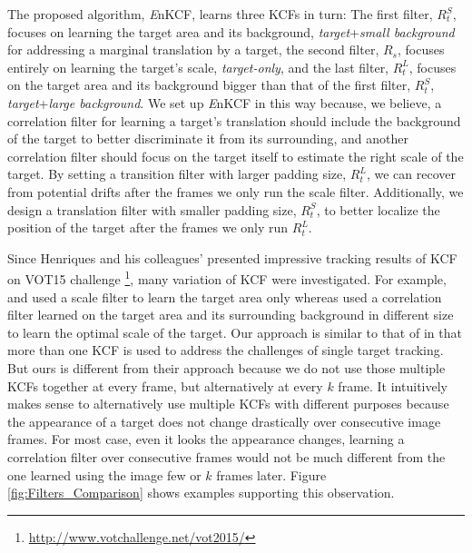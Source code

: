 \documentclass[10pt,twocolumn,letterpaper]{article}
\begin{document}
The proposed algorithm, {\it E}nKCF, learns three KCFs in turn: The
first filter, $R_{t}^{S}$, focuses on learning the target area and its
background, \textit{target}+\textit{small background} for addressing a
marginal translation by a target, the second filter, $R_{s}$, focuses
entirely on learning the target's scale, \textit{target-only}, and the
last filter, $R_{t}^{L}$, focuses on the target area and its
background bigger than that of the first filter, $R_{t}^{S}$,
\textit{target}+\textit{large background}. We set up {\it E}nKCF in
this way because, we believe, a correlation filter for learning a
target's translation should include the background of the target to
better discriminate it from its surrounding, and another correlation
filter should focus on the target itself to estimate the right scale
of the target. By setting a transition filter with larger padding
size, $R_{t}^{L}$, we can recover from potential drifts after the
frames we only run the scale filter. Additionally, we design a
translation filter with smaller padding size, $R_{t}^{S}$, to better
localize the position of the target after the frames we only run
$R_{t}^{L}$.

Since Henriques and his colleagues' presented impressive tracking
results of KCF \cite{henriques2015high} on VOT15
challenge \footnote{\url{http://www.votchallenge.net/vot2015/}}, many
variation of KCF were investigated. For example, \cite{ma2015long} and
\cite{danelljan2014accurate} used a scale filter to learn the target
area only whereas \cite{li2014scale, bibi2015multi, tang2015multi}
used a correlation filter learned on the target area and its
surrounding background in different size to learn the optimal scale of
the target. Our approach is similar to that of \cite{ma2015long} in
that more than one KCF is used to address the challenges of single
target tracking. But ours is different from their approach because we
do not use those multiple KCFs together at every frame, but
alternatively at every $k$ frame. It intuitively makes sense to
alternatively use multiple KCFs with different purposes because the
appearance of a target does not change drastically over consecutive
image frames. For most case, even it looks the appearance changes,
learning a correlation filter over consecutive frames would not be
much different from the one learned using the image few or $k$ frames
later. Figure \ref{fig:Filters_Comparison} shows examples supporting
this observation.
\end{document}
